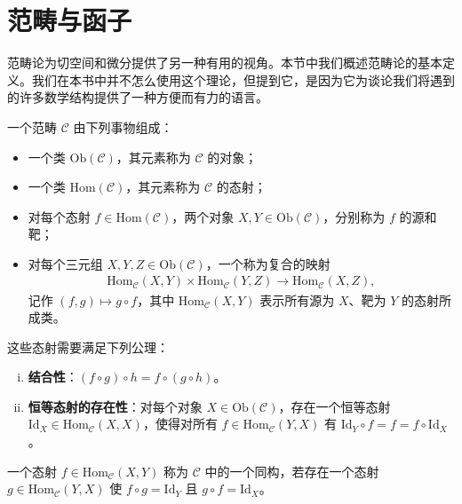 \documentclass[../../main.tex]{subfiles}
\begin{document}
\section{范畴与函子}\label{section:ch03-范畴与函子}

范畴论为切空间和微分提供了另一种有用的视角。本节中我们概述范畴论的基本定义。我们在本书中并不怎么使用这个理论，但提到它，是因为它为谈论我们将遇到的许多数学结构提供了一种方便而有力的语言。

一个范畴 $\mathcal{C}$ 由下列事物组成：
\begin{itemize}
\item 一个类 $\mathrm{Ob}(\mathcal{C})$，其元素称为 $\mathcal{C}$ 的对象；
\item 一个类 $\mathrm{Hom}(\mathcal{C})$，其元素称为 $\mathcal{C}$ 的态射；
\item 对每个态射 $f\in\mathrm{Hom}(\mathcal{C})$，两个对象 $X,Y\in\mathrm{Ob}(\mathcal{C})$，分别称为 $f$ 的源和靶；
\item 对每个三元组 $X,Y,Z\in\mathrm{Ob}(\mathcal{C})$，一个称为复合的映射
\begin{align*}
\mathrm{Hom}_{\mathcal{C}}(X,Y)\times\mathrm{Hom}_{\mathcal{C}}(Y,Z)\to\mathrm{Hom}_{\mathcal{C}}(X,Z),
\end{align*}
记作 $(f,g)\mapsto g\circ f$，其中 $\mathrm{Hom}_{\mathcal{C}}(X,Y)$ 表示所有源为 $X$、靶为 $Y$ 的态射所成类。
\end{itemize}

这些态射需要满足下列公理：
\begin{enumerate}[(i)]
\item \textbf{结合性}：$(f\circ g)\circ h=f\circ(g\circ h)$。
\item \textbf{恒等态射的存在性}：对每个对象 $X\in\mathrm{Ob}(\mathcal{C})$，存在一个恒等态射 $\mathrm{Id}_{X}\in\mathrm{Hom}_{\mathcal{C}}(X,X)$，使得对所有 $f\in\mathrm{Hom}_{\mathcal{C}}(Y,X)$ 有 $\mathrm{Id}_{Y}\circ f=f=f\circ\mathrm{Id}_{X}$。
\end{enumerate}

一个态射 $f\in\mathrm{Hom}_{\mathcal{C}}(X,Y)$ 称为 $\mathcal{C}$ 中的一个同构，若存在一个态射 $g\in\mathrm{Hom}_{\mathcal{C}}(Y,X)$ 使 $f\circ g=\mathrm{Id}_{Y}$ 且 $g\circ f=\mathrm{Id}_{X}$。
\end{document}
